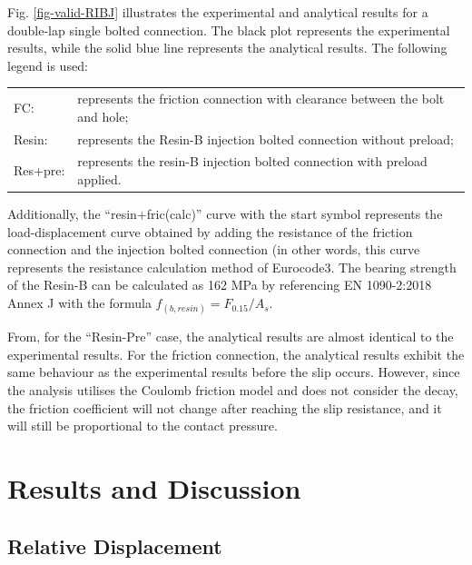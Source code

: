 Fig. \ref{fig-valid-RIBJ} illustrates the experimental and analytical results for a double-lap single bolted connection. The black plot represents the experimental results, while the solid blue line represents the analytical results. The following legend is used:

\begin{table}[ht]
    \centering
    \begin{tabular}{ll}
     FC:&  represents the friction connection with clearance between the bolt and hole;  \\
     Resin: & represents the Resin-B injection bolted connection without preload; \\
     Res+pre: & represents the resin-B injection bolted connection with preload applied.
    \end{tabular}
\end{table}
 
Additionally, the “resin+fric(calc)”   curve with the start symbol represents the load-displacement curve obtained by adding the resistance of the friction connection and the injection bolted connection (in other words, this curve represents the resistance calculation method of Eurocode3. The bearing strength of the Resin-B can be calculated as 162 MPa by referencing EN 1090-2:2018 Annex J with the formula $f_{(b,resin)}=F_{0.15}/A_s$.

From, for the “Resin-Pre” case, the analytical results are almost identical to the experimental results. For the friction connection, the analytical results exhibit the same behaviour as the experimental results before the slip occurs. However, since the analysis utilises the Coulomb friction model and does not consider the decay, the friction coefficient will not change after reaching the slip resistance, and it will still be proportional to the contact pressure.

\section{Results and Discussion}

\subsection{Relative Displacement}

